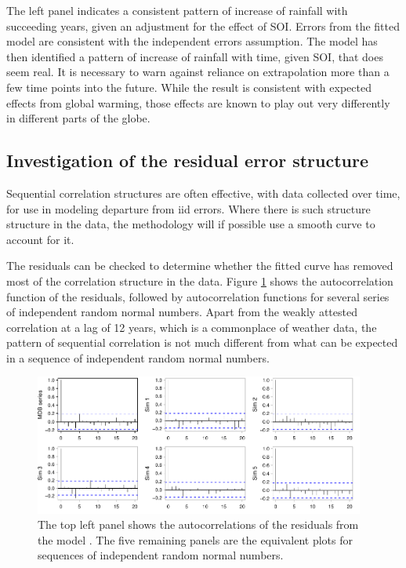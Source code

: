 The left panel indicates a consistent pattern of increase of rainfall
with succeeding years, given an adjustment for the effect of SOI.
Errors from the fitted model are consistent with the independent
errors assumption.  The model has then identified a pattern of
increase of rainfall with time, given SOI, that does seem real.  It is
necessary to warn against reliance on extrapolation more than a few
time points into the future. While the result is consistent with
expected effects from global warming, those effects are known to play
out very differently in different parts of the globe.

\subsection*{Investigation of the residual error structure}
Sequential correlation structures are often effective, with
data collected over time, for use in modeling departure from
iid errors.  Where there is such structure structure in the
data, the methodology will if possible use a smooth
curve to account for it.

The residuals can be checked to determine whether the fitted curve
has removed most of the correlation structure in the data.
Figure \ref{fig:ar1sims} shows the autocorrelation function of the
residuals, followed by autocorrelation functions for several series of
independent random normal numbers.  Apart from the weakly attested
correlation at a lag of 12 years, which is a commonplace of weather
data, the pattern of sequential correlation is not much different from
what can be expected in a sequence of independent random normal
numbers.

\begin{figure}
\begin{Schunk}


\centerline{\includegraphics[width=0.97\textwidth]{figs/9-ar1sims-1} }

\end{Schunk}
\caption{The top left panel shows the autocorrelations of the
  residuals from the model .  The five remaining
  panels are the equivalent plots for sequences of independent random
  normal numbers.}\label{fig:ar1sims}
\end{figure}

